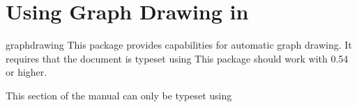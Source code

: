 %
%
%


\section{Using Graph Drawing in \tikzname}

{}

\begin{tikzlibrary}{graphdrawing}
    This package provides capabilities for automatic graph drawing. It requires
    that the document is typeset using  This package should work with
     0.54 or higher.
\end{tikzlibrary}

\ifluatex
\else
    This section of the manual can only be typeset using 
    \expandafter\endinput
\fi


\subsection{Choosing a Layout and a Library}

The graph drawing engine is initialized when you load the library
|graphdrawing|. This library provides the basic framework for graph drawing,
including all options and keys described in the present section. However, this
library does \emph{not} load any actual algorithms for drawing graphs. For
this, you need to use the following command, which is defined by the
|graphdrawing| library:

